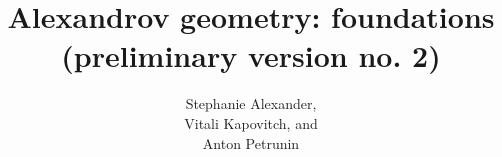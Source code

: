 \frontmatter
\title{Alexandrov geometry: foundations\\
{\large (preliminary version no. 2)}}
\date{}
\author{Stephanie Alexander,\\ Vitali Kapovitch, and\\ Anton Petrunin}
\maketitle
